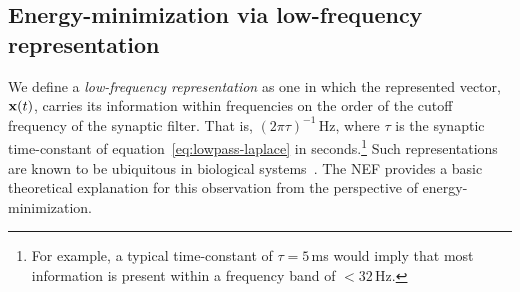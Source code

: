 

\subsection{Energy-minimization via low-frequency representation}
\label{sec:energy-minimization}

We define a \emph{low-frequency representation} as one in which the represented vector, $\mathbf{x}(t)$, carries its information within frequencies on the order of the cutoff frequency of the synaptic filter.
That is, $\left( 2 \pi \tau \right)^{-1}$\,Hz, where $\tau$ is the synaptic time-constant of equation~\ref{eq:lowpass-laplace} in seconds.\footnote{%
For example, a typical time-constant of $\tau = 5$\,ms would imply that most information is present within a frequency band of $< 32$\,Hz.
}
Such representations are known to be ubiquitous in biological systems~\citep{pulvermuller1997high, singer1999neuronal, szendro2001bio}.
The NEF provides a basic theoretical explanation for this observation from the perspective of energy-minimization.

